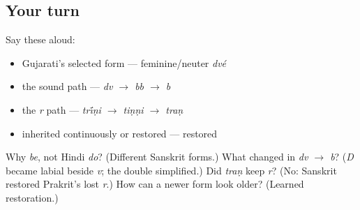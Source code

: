 \subsection*{Your turn}
Say these aloud:

\begin{itemize}
\raggedright
  \item Gujarati's selected form — feminine/neuter \emph{dvé}
  \item the sound path — \emph{dv $\to$ bb $\to$ b}
  \item the \emph{r} path — \emph{tr\'{\={\i}}ṇi $\to$ tiṇṇi $\to$ traṇ}
  \item inherited continuously or restored — restored
\end{itemize}

\begin{tcolorbox}[breakable,colback=teal!4,colframe=teal!35!black,title={Before you move on}]
Why \emph{be}, not Hindi \emph{do}? (Different Sanskrit forms.) What changed in \emph{dv $\to$ b}? (\emph{D} became labial beside \emph{v}; the double simplified.) Did \emph{traṇ} keep \emph{r}? (No: Sanskrit restored Prakrit's lost \emph{r}.) How can a newer form look older? (Learned restoration.)
\end{tcolorbox}
